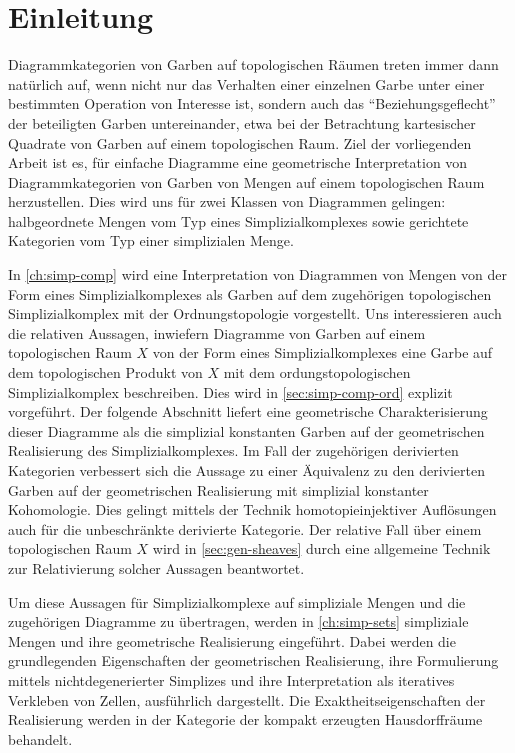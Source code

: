 
\section*{Einleitung}

Diagrammkategorien von Garben auf topologischen Räumen treten immer
dann natürlich auf, wenn nicht nur das Verhalten einer einzelnen Garbe
unter einer bestimmten Operation von Interesse ist, sondern auch das
``Beziehungsgeflecht'' der beteiligten Garben untereinander, etwa bei
der Betrachtung kartesischer Quadrate von Garben auf einem
topologischen Raum. Ziel der vorliegenden Arbeit ist es, für einfache
Diagramme eine geometrische Interpretation von Diagrammkategorien von
Garben von Mengen auf einem topologischen Raum herzustellen. Dies wird
uns für zwei Klassen von Diagrammen gelingen: halbgeordnete Mengen vom
Typ eines Simplizialkomplexes sowie gerichtete Kategorien vom Typ
einer simplizialen Menge.

In \autoref{ch:simp-comp} wird eine Interpretation von Diagrammen von
Mengen von der Form eines Simplizialkomplexes als Garben auf dem
zugehörigen topologischen Simplizialkomplex mit der Ordnungstopologie
vorgestellt. Uns interessieren auch die relativen Aussagen, inwiefern
Diagramme von Garben auf einem topologischen Raum $X$ von der Form
eines Simplizialkomplexes eine Garbe auf dem topologischen Produkt von
$X$ mit dem ordungstopologischen Simplizialkomplex beschreiben. Dies
wird in \autoref{sec:simp-comp-ord} explizit vorgeführt. Der folgende
Abschnitt liefert eine geometrische Charakterisierung dieser Diagramme
als die simplizial konstanten Garben auf der geometrischen
Realisierung des Simplizialkomplexes. Im Fall der zugehörigen
derivierten Kategorien verbessert sich die Aussage zu einer Äquivalenz
zu den derivierten Garben auf der geometrischen Realisierung mit
simplizial konstanter Kohomologie. Dies gelingt mittels der Technik
homotopieinjektiver Auflösungen auch für die unbeschränkte derivierte
Kategorie. Der relative Fall über einem topologischen Raum $X$ wird in
\autoref{sec:gen-sheaves} durch eine allgemeine Technik zur
Relativierung solcher Aussagen beantwortet.

Um diese Aussagen für Simplizialkomplexe auf simpliziale Mengen und
die zugehörigen Diagramme zu übertragen, werden in
\autoref{ch:simp-sets} simpliziale Mengen und ihre geometrische
Realisierung eingeführt. Dabei werden die grundlegenden Eigenschaften
der geometrischen Realisierung, ihre Formulierung mittels
nichtdegenerierter Simplizes und ihre Interpretation als iteratives
Verkleben von Zellen, ausführlich dargestellt. Die
Exaktheitseigenschaften der Realisierung werden in der Kategorie der
kompakt erzeugten Hausdorffräume behandelt.

